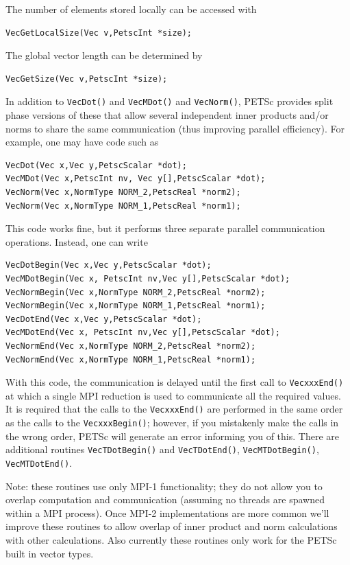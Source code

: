 The number of elements stored locally can be accessed with
\begin{lstlisting}
VecGetLocalSize(Vec v,PetscInt *size);
\end{lstlisting}
The global vector length can be determined by
\begin{lstlisting}
VecGetSize(Vec v,PetscInt *size);
\end{lstlisting}

In addition to \lstinline{VecDot()} and \lstinline{VecMDot()} and \lstinline{VecNorm()}, PETSc provides
split phase versions of these that allow several independent inner products and/or norms
to share the same communication (thus improving parallel efficiency). For example,
one may have code such as
\begin{lstlisting}
VecDot(Vec x,Vec y,PetscScalar *dot);
VecMDot(Vec x,PetscInt nv, Vec y[],PetscScalar *dot);
VecNorm(Vec x,NormType NORM_2,PetscReal *norm2);
VecNorm(Vec x,NormType NORM_1,PetscReal *norm1);
\end{lstlisting}
This code works fine, but it performs three separate parallel communication
operations. Instead, one can write
\begin{lstlisting}
VecDotBegin(Vec x,Vec y,PetscScalar *dot);
VecMDotBegin(Vec x, PetscInt nv,Vec y[],PetscScalar *dot);
VecNormBegin(Vec x,NormType NORM_2,PetscReal *norm2);
VecNormBegin(Vec x,NormType NORM_1,PetscReal *norm1);
VecDotEnd(Vec x,Vec y,PetscScalar *dot);
VecMDotEnd(Vec x, PetscInt nv,Vec y[],PetscScalar *dot);
VecNormEnd(Vec x,NormType NORM_2,PetscReal *norm2);
VecNormEnd(Vec x,NormType NORM_1,PetscReal *norm1);
\end{lstlisting}
With this code,
the communication is delayed until the first call to
\lstinline{VecxxxEnd()} at which
a single MPI reduction is used to communicate all the required values. It is required that the
calls to the \lstinline{VecxxxEnd()} are performed in the same order as the calls to the
\lstinline{VecxxxBegin()}; however, if you mistakenly make the calls in the wrong order, PETSc
will generate an error
informing you of this. There are additional routines \lstinline{VecTDotBegin()} and
\lstinline{VecTDotEnd()}, \lstinline{VecMTDotBegin()}, \lstinline{VecMTDotEnd()}.

Note: these routines use only MPI-1 functionality; they do not allow you to overlap
computation and communication (assuming no threads are spawned within a MPI process).
Once MPI-2 implementations are more common we'll improve these
routines to allow overlap of inner product and norm calculations with other calculations. 
Also currently these routines only work for the PETSc built in vector types. 

